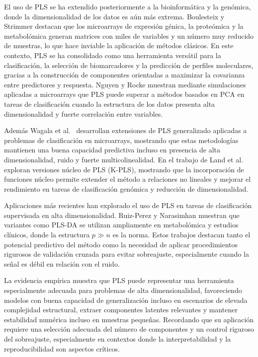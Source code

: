 \documentclass[12pt,a4paper]{report}
\begin{document}
El uso de PLS se ha extendido posteriormente a la bioinformática y la genómica, donde la dimensionalidad de los datos es aún más extrema. Boulesteix y Strimmer \cite{boulesteix2007} destacan que los microarrays de expresión génica, la proteómica y la metabolómica generan matrices con miles de variables y un número muy reducido de muestras, lo que hace inviable la aplicación de métodos clásicos. En este contexto, PLS se ha consolidado como una herramienta versátil para la clasificación, la selección de biomarcadores y la predicción de perfiles moleculares, gracias a la construcción de componentes orientadas a maximizar la covarianza entre predictores y respuesta. Nguyen y Rocke \cite{nguyen2004} muestran mediante simulaciones aplicadas a microarrays que PLS puede superar a métodos basados en PCA en tareas de clasificación cuando la estructura de los datos presenta alta dimensionalidad y fuerte correlación entre variables.

Además Wagala et al.\ \cite{wagala2020} desarrollan extensiones de PLS generalizado aplicadas a problemas de clasificación en microarrays, mostrando que estas metodologías mantienen una buena capacidad predictiva incluso en presencia de alta dimensionalidad, ruido y fuerte multicolinealidad. En el trabajo de Land et al.\ \cite{land2011} exploran versiones núcleo de PLS (K-PLS), mostrando que la incorporación de funciones núcleo permite extender el método a relaciones no lineales y mejorar el rendimiento en tareas de clasificación genómica y reducción de dimensionalidad.

Aplicaciones más recientes han explorado el uso de PLS en tareas de clasificación supervisada en alta dimensionalidad. Ruiz-Perez y Narasimhan \cite{ruizperez2020} muestran que variantes como PLS-DA se utilizan ampliamente en metabolómica y estudios clínicos, donde la estructura \(p \gg n\) es la norma. Estos trabajos destacan tanto el potencial predictivo del método como la necesidad de aplicar procedimientos rigurosos de validación cruzada para evitar sobreajuste, especialmente cuando la señal es débil en relación con el ruido.

La evidencia empírica muestra que PLS puede representar una herramienta especialmente adecuada para problemas de alta dimensionalidad, favoreciendo modelos con buena capacidad de generalización incluso en escenarios de elevada complejidad estructural, extraer componentes latentes relevantes y mantener estabilidad numérica incluso en muestras pequeñas. Recordando que su aplicación requiere una selección adecuada del número de componentes y un control riguroso del sobreajuste, especialmente en contextos donde la interpretabilidad y la reproducibilidad son aspectos críticos.
\end{document}
